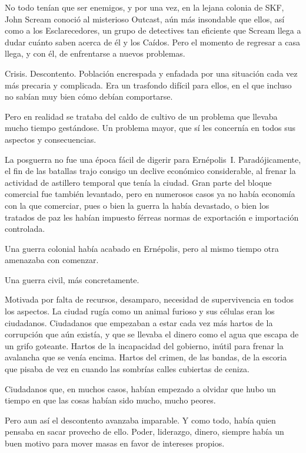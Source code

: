 \begin{prev}
    No todo tenían que ser enemigos, y por una vez, en la lejana colonia de SKF, John Scream conoció al misterioso Outcast, aún más insondable que ellos, así como a los Esclarecedores, un grupo de detectives tan eficiente que Scream llega a dudar cuánto saben acerca de él y los Caídos. Pero el momento de regresar a casa llega, y con él, de enfrentarse a nuevos problemas.
\end{prev}

\noindent
Crisis. Descontento. Población encrespada y enfadada por una situación cada vez más precaria y complicada. Era un trasfondo difícil para ellos, en el que incluso no sabían muy bien cómo debían comportarse.

Pero en realidad se trataba del caldo de cultivo de un problema que llevaba mucho tiempo gestándose. Un problema mayor, que sí les concernía en todos sus aspectos y consecuencias.

\bigskip\noindent
La posguerra no fue una época fácil de digerir para Ernépolis~I. Paradójicamente, el fin de las batallas trajo consigo un declive económico considerable, al frenar la actividad de astillero temporal que tenía la ciudad. Gran parte del bloque comercial fue también levantado, pero en numerosos casos ya no había economía con la que comerciar, pues o bien la guerra la había devastado, o bien los tratados de paz les habían impuesto férreas normas de exportación e importación controlada.

Una guerra colonial había acabado en Ernépolis, pero al mismo tiempo otra amenazaba con comenzar.

Una guerra civil, más concretamente.

Motivada por falta de recursos, desamparo, necesidad de supervivencia en todos los aspectos. La ciudad rugía como un animal furioso y sus células eran los ciudadanos. Ciudadanos que empezaban a estar cada vez más hartos de la corrupción que aún existía, y que se llevaba el dinero como el agua que escapa de un grifo goteante. Hartos de la incapacidad del gobierno, inútil para frenar la avalancha que se venía encima. Hartos del crimen, de las bandas, de la escoria que pisaba de vez en cuando las sombrías calles cubiertas de ceniza.

Ciudadanos que, en muchos casos, habían empezado a olvidar que hubo un tiempo en que las cosas habían sido mucho, mucho peores.

Pero aun así el descontento avanzaba imparable. Y como todo, había quien pensaba en sacar provecho de ello. Poder, liderazgo, dinero, siempre había un buen motivo para mover masas en favor de intereses propios.

